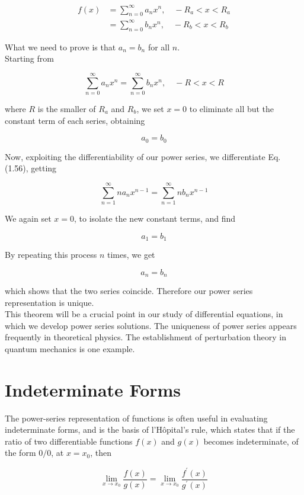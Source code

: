 \documentclass[10pt]{article}
\begin{document}
\begin{align*}
f(x) & =\sum_{n=0}^{\infty} a_{n} x^{n}, \quad-R_{a}<x<R_{a} \\
& =\sum_{n=0}^{\infty} b_{n} x^{n}, \quad-R_{b}<x<R_{b} \tag{1.55}
\end{align*}


What we need to prove is that $a_{n}=b_{n}$ for all $n$.\\
Starting from


\begin{equation*}
\sum_{n=0}^{\infty} a_{n} x^{n}=\sum_{n=0}^{\infty} b_{n} x^{n}, \quad-R<x<R \tag{1.56}
\end{equation*}


where $R$ is the smaller of $R_{a}$ and $R_{b}$, we set $x=0$ to eliminate all but the constant term of each series, obtaining

$$
a_{0}=b_{0}
$$

Now, exploiting the differentiability of our power series, we differentiate Eq. (1.56), getting


\begin{equation*}
\sum_{n=1}^{\infty} n a_{n} x^{n-1}=\sum_{n=1}^{\infty} n b_{n} x^{n-1} \tag{1.57}
\end{equation*}


We again set $x=0$, to isolate the new constant terms, and find

$$
a_{1}=b_{1}
$$

By repeating this process $n$ times, we get

$$
a_{n}=b_{n}
$$

which shows that the two series coincide. Therefore our power series representation is unique.\\
This theorem will be a crucial point in our study of differential equations, in which we develop power series solutions. The uniqueness of power series appears frequently in theoretical physics. The establishment of perturbation theory in quantum mechanics is one example.

\section*{Indeterminate Forms}
The power-series representation of functions is often useful in evaluating indeterminate forms, and is the basis of l'Hôpital's rule, which states that if the ratio of two differentiable functions $f(x)$ and $g(x)$ becomes indeterminate, of the form $0 / 0$, at $x=x_{0}$, then


\begin{equation*}
\lim _{x \rightarrow x_{0}} \frac{f(x)}{g(x)}=\lim _{x \rightarrow x_{0}} \frac{f^{\prime}(x)}{g^{\prime}(x)} \tag{1.58}
\end{equation*}
\end{document}
